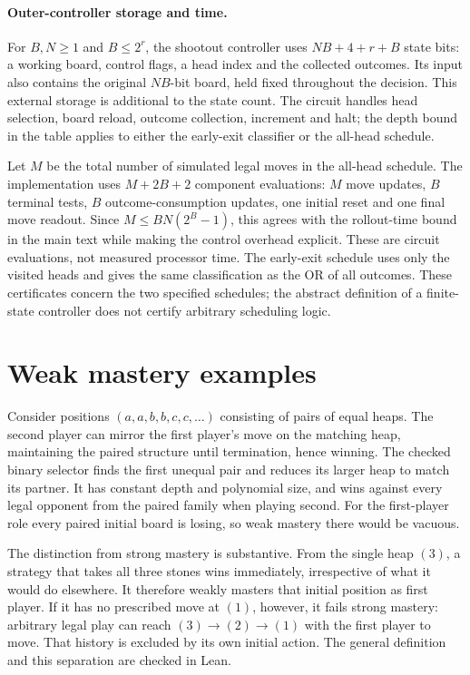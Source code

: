 \documentclass[twoside,11pt]{article}
\numberwithin{theorem}{section}
\numberwithin{equation}{section}
\begin{document}
\paragraph{Outer-controller storage and time.}
\label{par:controller-costs}
For $B,N\ge1$ and $B\le2^r$, the shootout controller uses $NB+4+r+B$ state bits: a working board, control flags, a head index and the collected outcomes. Its input also contains the original $NB$-bit board, held fixed throughout the decision. This external storage is additional to the state count. The circuit handles head selection, board reload, outcome collection, increment and halt; the depth bound in the table applies to either the early-exit classifier or the all-head schedule.

Let $M$ be the total number of simulated legal moves in the all-head schedule. The implementation uses $M+2B+2$ component evaluations: $M$ move updates, $B$ terminal tests, $B$ outcome-consumption updates, one initial reset and one final move readout. Since $M\le BN(2^B-1)$, this agrees with the rollout-time bound in the main text while making the control overhead explicit. These are circuit evaluations, not measured processor time. The early-exit schedule uses only the visited heads and gives the same classification as the OR of all outcomes. These certificates concern the two specified schedules; the abstract definition of a finite-state controller does not certify arbitrary scheduling logic.

\section{Weak mastery examples}
\label{app:weak}

\begin{example}
Consider positions $(a,a,b,b,c,c,\dots)$ consisting of pairs of equal heaps. The second player can mirror the first player’s move on the matching heap, maintaining the paired structure until termination, hence winning. The checked binary selector finds the first unequal pair and reduces its larger heap to match its partner. It has constant depth and polynomial size, and wins against every legal opponent from the paired family when playing second. For the first-player role every paired initial board is losing, so weak mastery there would be vacuous.
\end{example}

The distinction from strong mastery is substantive. From the single heap $(3)$, a strategy that takes all three stones wins immediately, irrespective of what it would do elsewhere. It therefore weakly masters that initial position as first player. If it has no prescribed move at $(1)$, however, it fails strong mastery: arbitrary legal play can reach $(3)\to(2)\to(1)$ with the first player to move. That history is excluded by its own initial action. The general definition and this separation are checked in Lean.
\end{document}
